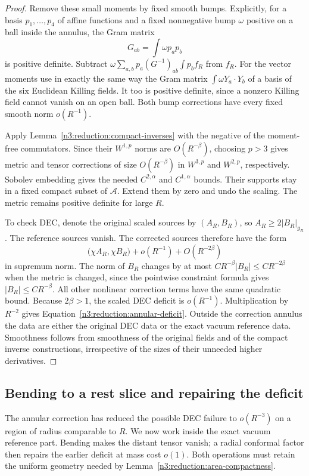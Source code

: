 \begin{proof}
Remove these small moments by fixed smooth bumps.  Explicitly, for a
basis $p_1,\ldots,p_4$ of affine functions and a fixed nonnegative bump
$\omega$ positive on a ball inside the annulus, the Gram matrix
\[
 G_{ab}=\int\omega p_ap_b
\]
is positive definite.  Subtract
$\omega\sum_{a,b}p_a(G^{-1})_{ab}\int p_bf_R$ from $f_R$.
For the vector moments use in exactly the same way the Gram matrix
$\int\omega Y_a\cdot Y_b$ of a basis of the six Euclidean Killing fields.
It too is positive definite, since a nonzero Killing field cannot vanish
on an open ball.  Both bump corrections have every fixed smooth norm
$o(R^{-1})$.

Apply Lemma~\ref{n3:reduction:compact-inverses} with the negative of the
moment-free commutators.  Since their $W^{1,p}$ norms are $O(R^{-\beta})$,
choosing $p>3$ gives metric and tensor corrections of size $O(R^{-\beta})$
in $W^{3,p}$ and $W^{2,p}$, respectively.  Sobolev embedding gives the
needed $C^{2,\alpha}$ and $C^{1,\alpha}$ bounds.  Their supports stay in
a fixed compact subset of $\mathcal A$.  Extend them by zero and undo
the scaling.  The metric remains positive definite for large $R$.

To check DEC, denote the original scaled sources by $(A_R,B_R)$, so
$A_R\ge2|B_R|_{g_R}$.  The reference sources vanish.  The corrected
sources therefore have the form
\[
 \bigl(\chi A_R,\chi B_R\bigr)
       +o(R^{-1})+O(R^{-2\beta})
\]
in supremum norm.  The norm of $B_R$ changes by at most
$CR^{-\beta}|B_R|\le CR^{-2\beta}$ when the metric is changed, since
the pointwise constraint formula gives $|B_R|\le CR^{-\beta}$.
All other nonlinear correction terms have the same quadratic bound.
Because $2\beta>1$, the scaled DEC deficit is $o(R^{-1})$.
Multiplication by $R^{-2}$ gives
Equation~\eqref{n3:reduction:annular-deficit}.  Outside the correction annulus
the data are either the original DEC data or the exact vacuum reference
data.  Smoothness follows from smoothness of the original fields and of
the compact inverse constructions, irrespective of the sizes of their
unneeded higher derivatives.
\end{proof}

\subsection{Bending to a rest slice and repairing the deficit}

The annular correction has reduced the possible DEC failure to
$o(R^{-3})$ on a region of radius comparable to $R$. We now work inside
the exact vacuum reference part. Bending makes the distant tensor vanish;
a radial conformal factor then repairs the earlier deficit at mass cost
$o(1)$. Both operations must retain the uniform geometry needed by
Lemma~\ref{n3:reduction:area-compactness}.

